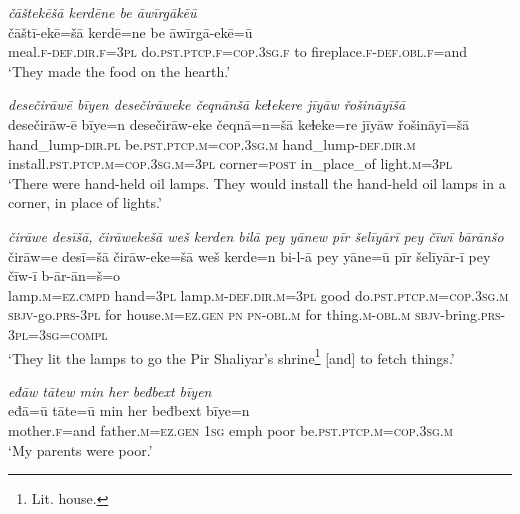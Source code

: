\ea \label{ŽE.39}
\textit{čāštekēšā kerdēne be āwīrgākēū} \\ 
\gll čāštī-ekē=šā kerdē=ne be āwīrgā-ekē=ū \\ 
 meal\textsc{.f}\textsc{-def}\textsc{.dir}\textsc{.f}\textsc{=3pl} do\textsc{.pst}\textsc{.ptcp}\textsc{.f}\textsc{=cop}\textsc{.3sg}\textsc{.f} to fireplace\textsc{.f}\textsc{-def}\textsc{.obl}\textsc{.f}=and \\ 
\glt `They made the food on the hearth.'
\z 
 
\ea \label{ŽE.41}
\textit{desečirāwē bīyen desečirāweke čeqnānšā keɫekere jīyāw řošināyīšā} \\ 
\gll desečirāw-ē bīye=n desečirāw-eke čeqnā=n=šā keɫeke=re jīyāw řošināyī=šā \\ 
 hand\_lump\textsc{-dir}\textsc{.pl} be\textsc{.pst}\textsc{.ptcp}\textsc{.m}\textsc{=cop}\textsc{.3sg}\textsc{.m} hand\_lump\textsc{-def}\textsc{.dir}\textsc{.m} install\textsc{.pst}\textsc{.ptcp}\textsc{.m}\textsc{=cop}\textsc{.3sg}\textsc{.m}\textsc{=3pl} corner\textsc{=\textsc{post}} in\_place\_of light\textsc{.m}\textsc{=3pl} \\ 
\glt `There were hand-held oil lamps. They would install the hand-held oil lamps in a corner, in place of lights.'
\z 
 
\ea \label{ŽE.42}
\textit{čirāwe desīšā, čirāwekešā weš kerden bilā pey yānew pīr šelīyārī pey čīwī bārānšo} \\ 
\gll čirāw=e desī=šā čirāw-eke=šā weš kerde=n bi-l-ā pey yāne=ū pīr šelīyār-ī pey čīw-ī b-ār-ān=š=o \\ 
 lamp\textsc{.m}\textsc{=ez}\textsc{.cmpd} hand\textsc{=3pl} lamp\textsc{.m}\textsc{-def}\textsc{.dir}\textsc{.m}\textsc{=3pl} good do\textsc{.pst}\textsc{.ptcp}\textsc{.m}\textsc{=cop}\textsc{.3sg}\textsc{.m} \textsc{sbjv-}go\textsc{.prs}\textsc{-3pl} for house\textsc{.m}\textsc{\textsc{=ez.gen}} \textsc{pn} \textsc{pn}\textsc{-obl}\textsc{.m} for thing\textsc{.m}\textsc{-obl}\textsc{.m} \textsc{sbjv-}bring\textsc{.prs}\textsc{-3pl}\textsc{=3sg}\textsc{=compl} \\ 
\glt `They lit the lamps to go the Pir Shaliyar’s shrine\footnote{Lit. house.} [and] to fetch things.'
\z 
 
\ea \label{ŽE.43}
\textit{eđāw tātew min her beđbext bīyen} \\ 
\gll eđā=ū tāte=ū min her beđbext bīye=n \\ 
 mother\textsc{.f}=and father\textsc{.m}\textsc{\textsc{=ez.gen}} \textsc{1sg} emph poor be\textsc{.pst}\textsc{.ptcp}\textsc{.m}\textsc{=cop}\textsc{.3sg}\textsc{.m} \\ 
\glt `My parents were poor.'
\z 
 
